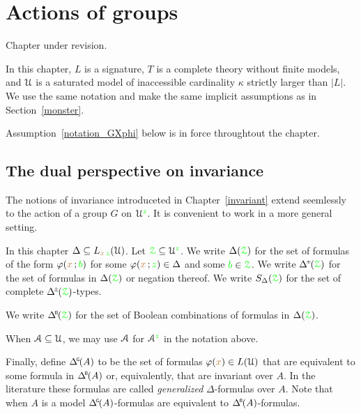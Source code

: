 \chapter{Actions of groups}
\label{actions}

\def\medrel#1{\parbox[t]{5ex}{$\displaystyle\hfil #1$}}
\def\ceq#1#2#3{\parbox[t]{17ex}{$\displaystyle #1$}\medrel{#2}{$\displaystyle #3$}}

\noindent\llap{\textcolor{red}{\Large\warning}\kern1.5ex}\ignorespaces
Chapter under revision.

In this chapter, $L$ is a signature, $T$ is a complete theory without finite models, and $\EuScript U$ is a saturated model of inaccessible cardinality $\kappa$ strictly larger than $|L|$.
We use the same notation and make the same implicit assumptions as in Section~\ref{monster}.

Assumption~\ref{notation_GXphi} below is in force throughtout the chapter. 

\section{The dual perspective on invariance}\label{dual_perspective}

The notions of invariance introduceted in Chapter~\ref{invariant} extend seemlessly to the action of a group $G$ on $\EuScript U^{\color{green} z}$.
It is convenient to work in a more general setting.

In this chapter $\Delta\subseteq L_{{\color{brown} x}\,{\color{green} z}}(\EuScript U)$.
Let ${\color{green}\EuScript Z}\subseteq\EuScript U^{\color{green} z}$.
We write \emph{$\Delta({\color{green}\EuScript Z})$} for the set of formulas of the form $\varphi({\color{brown} x}\,;{\color{green} b})$ for some $\varphi({\color{brown} x}\,;{\color{green} z})\in\Delta$ and some ${\color{green} b}\in{\color{green}\EuScript Z}$.
We write \emph{$\pmDelta(\grZ)$} for the set of formulas in $\Delta({\color{green}\EuScript Z})$ or negation thereof.
We write $S_\Delta({\color{green}\EuScript Z})$ for the set of complete $\pmDelta(\grZ)$-types.

We write \emph{$\BDelta(\grZ)$} for the set of Boolean combinations of formulas in $\Delta({\color{green}\EuScript Z})$.

When $\EuScript A\subseteq\EuScript U$, we may use $\EuScript A$ for $\EuScript A^{\color{green} z}$ in the notation above.

Finally, define \emph{$\GDelta(A)$\/} to be the set of formulas $\varphi({\color{brown} x})\in L(\EuScript U)$ that are equivalent to some formula in $\BDelta(A)$ or, equivalently, that are invariant over $A$.
In the literature these formulas are called \textit{generalized\/} $\Delta$-formulas over $A$.
Note that when $A$ is a model $\GDelta(A)$-formulas are equivalent to $\BDelta(A)$-formulas.


